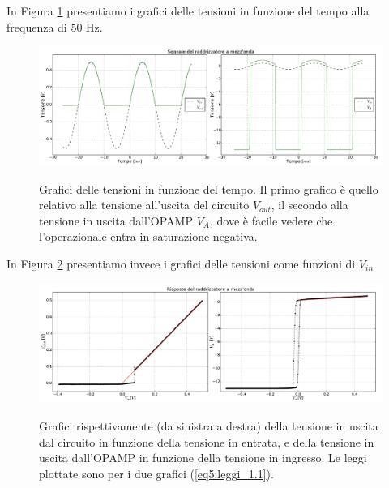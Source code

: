 In Figura \ref{gr5:primo_raddrizzatore} presentiamo i grafici delle tensioni in funzione del tempo alla frequenza di $50$ \si{\hertz}.

\begin{figure}[H]
 \centering
   {\includegraphics[width=16.5cm]{../E05/latex/unite_tempo.pdf}}
 \caption{Grafici delle tensioni in funzione del tempo. Il primo grafico è quello relativo alla tensione all'uscita del circuito $V_{out}$, il secondo alla tensione in uscita dall'OPAMP $V_A$, dove è facile vedere che l'operazionale entra in saturazione negativa.}
 \label{gr5:primo_raddrizzatore}
\end{figure}

In Figura \ref{gr5:primo_raddrizzatore_vin} presentiamo invece i grafici delle tensioni come funzioni di $V_{in}$

\begin{figure}[H]
 \centering
   {\includegraphics[width=16.5cm]{../E05/latex/u_risposta.pdf}}
 \caption{Grafici rispettivamente (da sinistra a destra) della tensione in uscita dal circuito in funzione della tensione in entrata, e della tensione in uscita dall'OPAMP in funzione della tensione in ingresso. Le leggi plottate sono per i due grafici (\ref{eq5:leggi_1.1}).}
 \label{gr5:primo_raddrizzatore_vin}
\end{figure}

